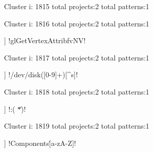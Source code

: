 Cluster i: 1815
total projects:2
total patterns:1
\begin{multicols}{1}
\end{multicols}







Cluster i: 1816
total projects:2
total patterns:1
\begin{multicols}{1}
\begin{description}[noitemsep,topsep=0pt]
\item [[2] ] \cverb!glGetVertexAttribfvNV!
\end{description}
\end{multicols}







Cluster i: 1817
total projects:2
total patterns:1
\begin{multicols}{1}
\begin{description}[noitemsep,topsep=0pt]
\item [[2] ] \cverb!/dev/disk([0-9]+)[^s]!
\end{description}
\end{multicols}







Cluster i: 1818
total projects:2
total patterns:1
\begin{multicols}{1}
\begin{description}[noitemsep,topsep=0pt]
\item [[2] ] \cverb!:( *\n     \|\n)!
\end{description}
\end{multicols}







Cluster i: 1819
total projects:2
total patterns:1
\begin{multicols}{1}
\begin{description}[noitemsep,topsep=0pt]
\item [[2] ] \cverb!Components\.[a-zA-Z]!
\end{description}
\end{multicols}







